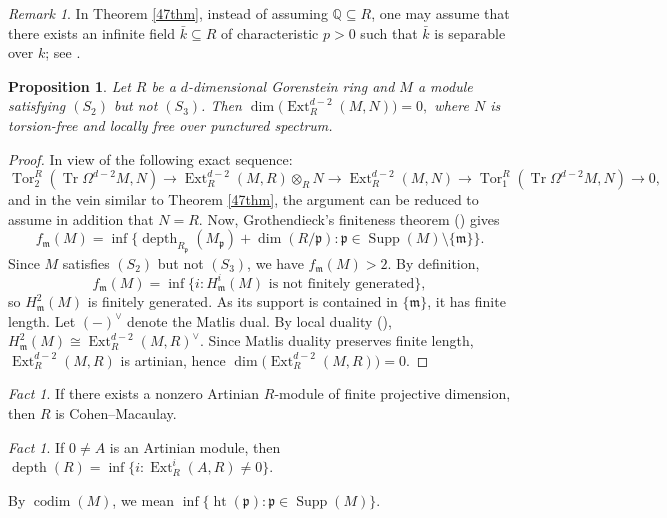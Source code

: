 \documentclass[11.05pt,a4paper]{amsart}
\newtheorem{proposition}[theorem]{Proposition}
\theoremstyle{definition}
\theoremstyle{remark}
\newtheorem{remark}[theorem]{Remark}\newtheorem{fact}[theorem]{Fact}
\newcommand{\Tr}{\operatorname{Tr}}
\newcommand{\Ext}{\operatorname{Ext}}
\newcommand{\Supp}{\operatorname{Supp}}
\newcommand{\Tor}{\operatorname{Tor}}
\newcommand{\depth}{\operatorname{depth}}
\begin{document}
\begin{remark}
	In Theorem \ref{47thm}, instead of assuming $\mathbb{Q} \subseteq R$, one may assume that there exists an infinite field $\bar{k} \subseteq R$ of characteristic $p>0$ such that $\bar{k}$ is separable over $k$; see \cite[Theorem 2.17]{syz}.
\end{remark}

\begin{proposition}
	Let $R$ be a $d$-dimensional Gorenstein ring and $M$ a module satisfying $(S_2)$ but not $(S_3)$. Then
	\(
	\dim\!\big(\Ext^{d-2}_R(M, N)\big) = 0,
	\)
where  $N$  is torsion-free and locally free over punctured spectrum.  
\end{proposition}

\begin{proof}
In view of the following exact sequence: $$
\Tor_2^R(\Tr\Omega^{d-2}M,N)\rightarrow\Ext^{d-2}_R(M,R)\otimes_RN\rightarrow\Ext^{d-2}_R(M,N)\rightarrow\Tor_1^R(\Tr\Omega^{d-2}M,N)\rightarrow0,
$$and in the vein similar to  {Theorem} \ref{47thm}, the argument can be reduced to assume in addition that $N=R$. Now,	Grothendieck’s finiteness theorem (\cite[Section 9]{BSh}) gives
	\[
	f_{\mathfrak m}(M)
	= \inf\{\depth_{R_{\mathfrak p}}(M_{\mathfrak p}) + \dim(R/\mathfrak p) 
	: \mathfrak p \in \Supp(M)\setminus\{\mathfrak m\}\}.
	\]
	Since $M$ satisfies $(S_2)$ but not $(S_3)$, we have $f_{\mathfrak m}(M) > 2$. By definition,
	\[
	f_{\mathfrak m}(M)
	= \inf\{i : H^i_{\mathfrak m}(M) \text{ is not finitely generated}\},
	\]
	so $H^2_{\mathfrak m}(M)$ is finitely generated. As its support is contained in $\{\mathfrak m\}$, it has finite length.
	Let $(-)^\vee$ denote the Matlis dual. By local duality (\cite[Section 8]{BSh}),
	\(
	H^2_{\mathfrak m}(M) \cong \Ext^{d-2}_R(M, R)^\vee.
	\)
	Since Matlis duality preserves finite length, $\Ext^{d-2}_R(M,R)$ is artinian, hence
	\(
	\dim\!\big(\Ext^{d-2}_R(M,R)\big) = 0.
	\)
\end{proof}

\begin{fact}\label{art}
	If there exists a nonzero Artinian $R$-module of finite projective dimension, then $R$ is Cohen–Macaulay.
\end{fact}

\begin{fact}\label{dep}
	If $0 \neq A$ is an Artinian module, then
	\(
	\depth(R) = \inf\{ i : \Ext^i_R(A,R) \neq 0\}.
	\)
\end{fact}

By 
$\operatorname{codim}(M)$, we mean \( \inf\{\operatorname{ht}(\mathfrak p) : \mathfrak p \in \Supp(M)\}.
\)
\end{document}
